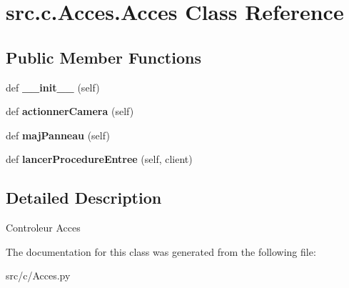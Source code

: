 \hypertarget{classsrc_1_1c_1_1_acces_1_1_acces}{}\section{src.\+c.\+Acces.\+Acces Class Reference}
\label{classsrc_1_1c_1_1_acces_1_1_acces}
\subsection*{Public Member Functions}
\begin{DoxyCompactItemize}
\item 
\hypertarget{classsrc_1_1c_1_1_acces_1_1_acces_aebb8a6b243cc13b83cac26b3305bed9f}{}def {\bfseries \+\_\+\+\_\+init\+\_\+\+\_\+} (self)\label{classsrc_1_1c_1_1_acces_1_1_acces_aebb8a6b243cc13b83cac26b3305bed9f}

\item 
\hypertarget{classsrc_1_1c_1_1_acces_1_1_acces_a9da02d9e9b93673d54716ec1746a4312}{}def {\bfseries actionner\+Camera} (self)\label{classsrc_1_1c_1_1_acces_1_1_acces_a9da02d9e9b93673d54716ec1746a4312}

\item 
\hypertarget{classsrc_1_1c_1_1_acces_1_1_acces_a4402d9215248b2796f1c4d1e3a6ebab8}{}def {\bfseries maj\+Panneau} (self)\label{classsrc_1_1c_1_1_acces_1_1_acces_a4402d9215248b2796f1c4d1e3a6ebab8}

\item 
\hypertarget{classsrc_1_1c_1_1_acces_1_1_acces_a53a1247eca0d8a5ce28fe70781f66222}{}def {\bfseries lancer\+Procedure\+Entree} (self, client)\label{classsrc_1_1c_1_1_acces_1_1_acces_a53a1247eca0d8a5ce28fe70781f66222}

\end{DoxyCompactItemize}


\subsection{Detailed Description}
\begin{DoxyVerb}Controleur Acces
\end{DoxyVerb}
 

The documentation for this class was generated from the following file\+:\begin{DoxyCompactItemize}
\item 
src/c/Acces.\+py\end{DoxyCompactItemize}
